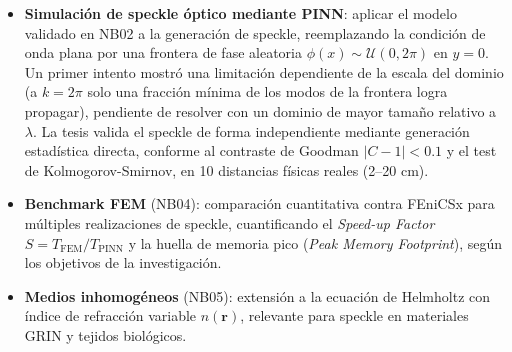 \begin{itemize}
  \item \textbf{Simulación de speckle óptico mediante PINN}: aplicar el modelo validado
    en NB02 a la generación de speckle, reemplazando la condición de onda plana por una
    frontera de fase aleatoria $\phi(x) \sim \mathcal{U}(0, 2\pi)$ en $y = 0$. Un primer
    intento mostró una limitación dependiente de la escala del dominio (a $k=2\pi$ solo
    una fracción mínima de los modos de la frontera logra propagar), pendiente de
    resolver con un dominio de mayor tamaño relativo a $\lambda$. La tesis valida el
    speckle de forma independiente mediante generación estadística directa, conforme al
    contraste de Goodman $|C - 1| < 0.1$ y el test de Kolmogorov-Smirnov, en 10
    distancias físicas reales (2--20 cm).

  \item \textbf{Benchmark FEM} (NB04): comparación cuantitativa contra FEniCSx para
    múltiples realizaciones de speckle, cuantificando el \textit{Speed-up Factor}
    $S = T_{\mathrm{FEM}} / T_{\mathrm{PINN}}$ \cite{Thuerey2021_PBDL} y la
    huella de memoria pico (\textit{Peak Memory Footprint}), según los objetivos
    de la investigación.

  \item \textbf{Medios inhomogéneos} (NB05): extensión a la ecuación de Helmholtz
    con índice de refracción variable $n(\mathbf{r})$, relevante para speckle en
    materiales GRIN y tejidos biológicos.
\end{itemize}
